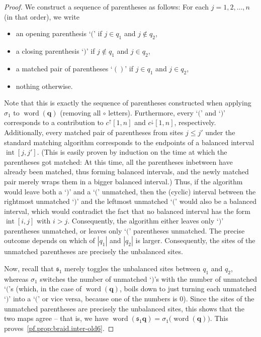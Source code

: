 \documentclass[reqno]{amsart}
\newcommand{\0}{\phantom{c}}
\DeclareMathOperator{\inter}{int} %
\DeclareMathOperator{\word}{word} %
\newcommand{\qq}{\mathbf{q}}
\newcommand{\fraks}{\mathfrak{s}}
\newenvironment{verlong}{}{}
\newcommand{\abs}[1]{\left| #1 \right|}
\theoremstyle{plain}
\theoremstyle{definition}
\numberwithin{equation}{section}
\begin{document}
\begin{verlong}
\begin{proof}
We construct a sequence of parentheses as follows: For each $j = 1, 2, \dotsc, n$ (in that order), we write
\begin{itemize}
\item an opening parenthesis `$($' if $j \in q_1$ and $j \notin q_2$,
\item a closing parenthesis `$)$' if $j \notin q_1$ and $j \in q_2$,
\item a matched pair of parentheses `$()$' if $j \in q_1$ and $j \in q_2$,
\item nothing otherwise.
\end{itemize}
Note that this is exactly the sequence of parentheses constructed when applying $\sigma_1$ to $\word(\qq)$ (removing all $\circ$ letters).
Furthermore, every `$($' and `$)$' corresponds to a contribution to $c^{\uparrow}[1,n]$ and $c^{\downarrow}[1,n]$, respectively.
Additionally, every matched pair of parentheses from sites $j \leq j'$ under the standard matching algorithm corresponds to the endpoints of a balanced interval $\inter[j,j']$. (This is easily proven by induction on the time at which the parentheses got matched: At this time, all the parentheses inbetween have already been matched, thus forming balanced intervals, and the newly matched pair merely wraps them in a bigger balanced interval.)
Thus, if the algorithm would leave both a `$)$' and a `$($' unmatched, then the (cyclic) interval between the rightmost unmatched `$)$' and the leftmost unmatched `$($' would also be a balanced interval, which would contradict the fact that no balanced interval has the form $\inter[i,j]$ with $i > j$.
Consequently, the algorithm either leaves only `$)$' parentheses unmatched, or leaves only `$($' parentheses unmatched.
The precise outcome depends on which of $\abs{q_1}$ and $\abs{q_2}$ is larger.
Consequently, the sites of the unmatched parentheses are precisely the unbalanced sites.

Now, recall that $\fraks_1$ merely toggles the unbalanced sites between $q_1$ and $q_2$, whereas $\sigma_1$ switches the number of unmatched `$)$'s with the number of unmatched `$($'s (which, in the case of $\word(\qq)$, boils down to just turning each unmatched `$)$' into a `$($' or vice versa, because one of the numbers is $0$). Since the sites of the unmatched parentheses are precisely the unbalanced sites, this shows that the two maps agree -- that is, we have $\word(\fraks_1 \qq) = \sigma_1\bigl( \word(\qq) \bigr)$. This proves~\eqref{pf.prop:braid.inter-old6}.


\end{proof}
\end{verlong}
\end{document}
